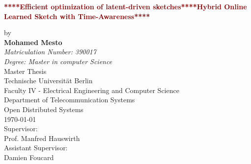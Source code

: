 \begin{titlepage}
\begin{figure}[H]
  \centering
  \vspace*{-1.22cm}
  \hfill
\end{figure}
	\begin{center}
	\vspace{1cm}
		\Huge
		\begin{spacing}{.9}
			\textcolor{DarkRed}{\textbf{****Efficient optimization of latent-driven sketches****Hybrid Online Learned Sketch with Time-Awareness****}}\\
		\end{spacing}
		\vspace{0.8cm}
		\large
		by\\
		\vspace{0.8cm} 
		\textbf{Mohamed Mesto}\\
		\vspace{0.8cm} 
		\emph{Matriculation Number: 390017}\\
		\emph{{Degree:} Master in computer Science}\\
		\vspace{1cm} 
	 	Master Thesis\\
		\vspace{0.5cm}
		Technische Universität Berlin\\
		Faculty IV - Electrical Engineering and Computer Science\\
		Department of Telecommunication Systems\\
		Open Distributed Systems\\
		\vspace{1.0cm}
		\today\\
		\vspace{1.0cm}
		\large
		Supervisor:\\
		Prof. Manfred Hauswirth\\
		\vspace{1cm}
		Assistant Supervisor:\\
		Damien Foucard
		\end{center}
\end{titlepage}
